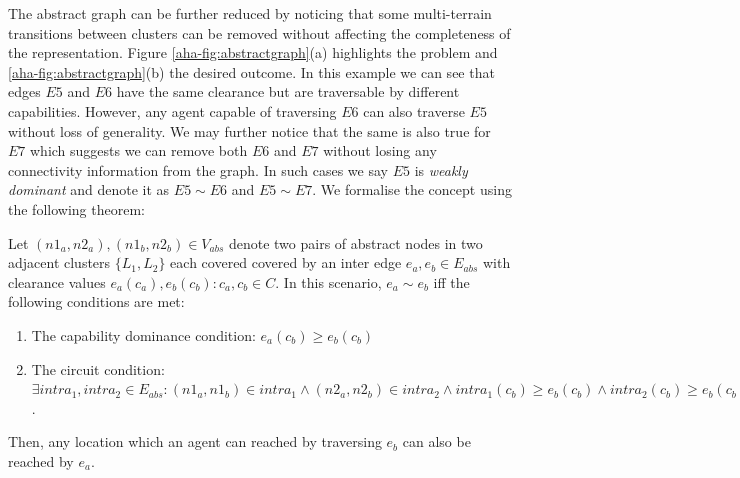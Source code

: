 The abstract graph can be further reduced by noticing that some multi-terrain transitions between clusters can be removed without affecting the completeness of the representation. 
Figure \ref{aha-fig:abstractgraph}(a) highlights the problem and \ref{aha-fig:abstractgraph}(b) the desired outcome.
In this example we can see that edges $E5$ and $E6$ have the same clearance but are traversable by different capabilities. 
However, any agent capable of traversing $E6$ can also traverse $E5$ without loss of generality. 
We may further notice that the same is also true for $E7$ which suggests we can remove both $E6$ and $E7$ without losing any connectivity information from the graph. 
In such cases we say $E5$ is \emph{weakly dominant} and denote it as $E5 \sim E6$ and $E5 \sim E7$. 
We formalise the concept using the following theorem:
\begin{theorem}
\label{aha-theorem:weakdominance}
Let $(n1_{a}, n2_{a}), (n1_{b}, n2_{b}) \in V_{abs}$ denote two pairs of abstract nodes in two adjacent clusters $\lbrace L_{1}, L_{2} \rbrace$ each covered covered by an inter edge $e_{a}, e_{b} \in E_{abs}$ with clearance values $e_{a}(c_{a}), e_{b}(c_{b})  : c_{a}, c_{b} \in C$.
 In this scenario, $e_{a} \sim e_{b}$ iff the following conditions are met:
\begin{enumerate}
\item{The capability dominance condition: $e_{a}(c_{b}) \geq e_{b}(c_{b})$}
\item{The circuit condition: $\exists intra_{1}, intra_{2} \in E_{abs} : (n1_{a}, n1_{b}) \in intra_{1} \wedge (n2_{a}, n2_{b}) \in intra_{2} \wedge intra_{1}(c_{b}) \geq e_{b}(c_{b}) \wedge intra_{2}(c_{b}) \geq e_{b}(c_{b})$.}
\end{enumerate}
Then, any location which an agent can reached by traversing $e_{b}$ can also be reached by $e_{a}$.
\end{theorem} 


